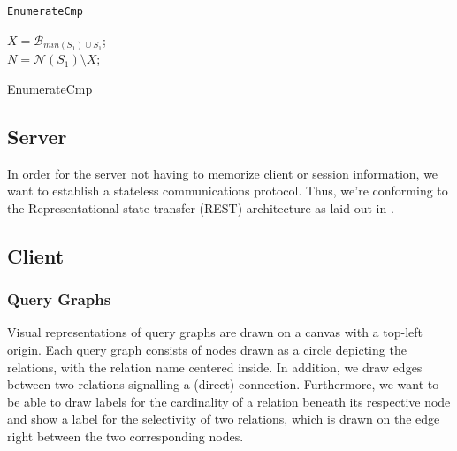 \texttt{EnumerateCmp}

\begin{algorithm}[H]
    \BlankLine
    $X = \mathcal{B}_{min(S_1) \cup S_1}$;\\
    $N = \mathcal{N}(S_1)\setminus X$;\\
    \vspace{0.5cm}
    \caption{EnumerateCmp}    
\end{algorithm}

\subsection{Server}
\label{sub:concepts-server}

In order for the server not having to memorize client or session information, we want to establish a stateless communications protocol.
Thus, we're conforming to the Representational state transfer (REST) architecture as laid out in \cite{fielding2000architectural}.

\subsection{Client}

\subsubsection{Query Graphs}
\label{subsub:query-graphs}

Visual representations of query graphs are drawn on a canvas with a top-left origin. Each query graph consists of nodes drawn as a circle depicting the relations, with the relation name centered inside. In addition, we draw edges  between two relations signalling a (direct) connection. Furthermore, we want to be able to draw labels for the cardinality of a relation beneath its respective node and show a label for the selectivity of two relations, which is drawn on the edge right between the two corresponding nodes.

